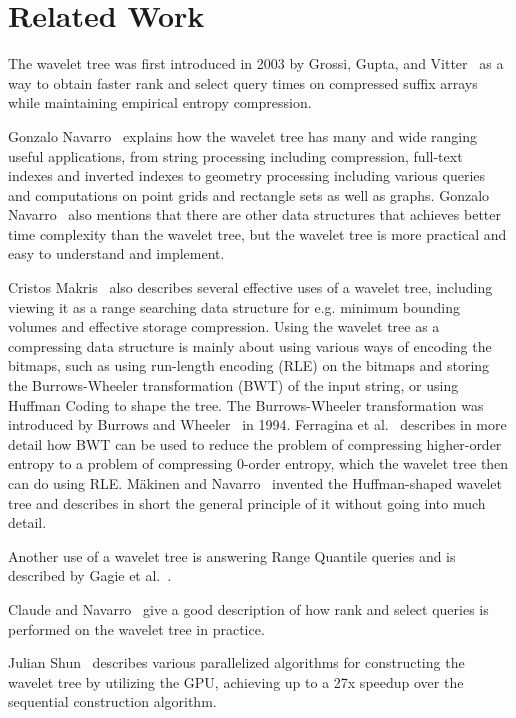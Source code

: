 \section{Related Work}
The wavelet tree was first introduced in 2003 by Grossi, Gupta, and Vitter~ as a way to obtain faster rank and select query times on compressed suffix arrays while maintaining empirical entropy compression.

Gonzalo Navarro~ explains how the wavelet tree has many and wide ranging useful applications, from string processing including compression, full-text indexes and inverted indexes to geometry processing including various queries and computations on point grids and rectangle sets as well as graphs. 
Gonzalo Navarro~ also mentions that there are other data structures that achieves better time complexity than the wavelet tree, but the wavelet tree is more practical and easy to understand and implement.

Cristos Makris~ also describes several effective uses of a wavelet tree, including viewing it as a range searching data structure for e.g. minimum bounding volumes and effective storage compression.
Using the wavelet tree as a compressing data structure is mainly about using various ways of encoding the bitmaps, such as using run-length encoding (RLE) on the bitmaps and storing the Burrows-Wheeler transformation (BWT) of the input string, or using Huffman Coding to shape the tree.
The Burrows-Wheeler transformation was introduced by Burrows and Wheeler~ in 1994.
Ferragina et al.~ describes in more detail how BWT can be used to reduce the problem of compressing higher-order entropy to a problem of compressing 0-order entropy, which the wavelet tree then can do using RLE.
Mäkinen and Navarro~ invented the Huffman-shaped wavelet tree and describes in short the general principle of it without going into much detail.

Another use of a wavelet tree is answering Range Quantile queries and is described by Gagie et al.~.

Claude and Navarro~ give a good description of how rank and select queries is performed on the wavelet tree in practice.

Julian Shun~ describes various parallelized algorithms for constructing the wavelet tree by utilizing the GPU, achieving up to a 27x speedup over the sequential construction algorithm.

